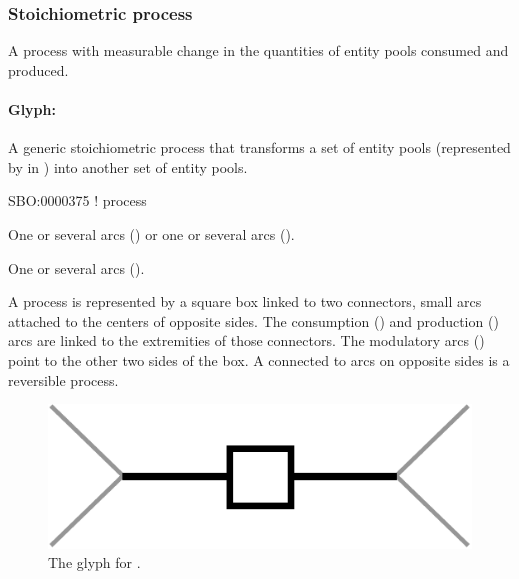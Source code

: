 \subsubsection{Stoichiometric process}

A process with measurable change in the quantities of entity pools
consumed and produced. 



\paragraph{Glyph: }
\label{sec:process}

A generic stoichiometric process that transforms a set of entity pools (represented by  in \SBGNPDLone) into another set of entity pools.

\begin{glyphDescription}

\glyphSboTerm SBO:0000375 ! process

\glyphOrigin One or several  arcs () or one or several  arcs ().

\glyphTarget One or several  arcs ().

\glyphNode A process is represented by a square box linked to two connectors, small arcs attached to the centers of opposite sides. The consumption () and production () arcs are linked to the extremities of those connectors. The modulatory arcs () point to the other two sides of the box. A  connected to  arcs on opposite sides is a reversible process. 

\end{glyphDescription}

\begin{figure}[H]
  \centering
  \includegraphics[scale = 0.4]{images/process}
  \caption{The \PD glyph for .}
  \label{fig:process}
\end{figure}

